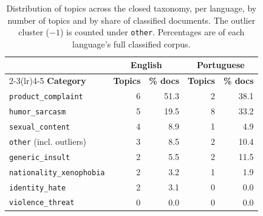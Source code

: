 \begin{table}[htb]
    \centering
    \caption{Distribution of topics across the closed taxonomy, per language, by number of topics and by share of classified documents. The outlier cluster ($-1$) is counted under \texttt{other}. Percentages are of each language's full classified corpus.}
    \label{tab:semantic-categories}
    \small
    \begin{tabular}{lrrrr}
        \toprule
         & \multicolumn{2}{c}{\textbf{English}} & \multicolumn{2}{c}{\textbf{Portuguese}} \\
        \cmidrule(lr){2-3}\cmidrule(lr){4-5}
        \textbf{Category} & \textbf{Topics} & \textbf{\% docs} & \textbf{Topics} & \textbf{\% docs} \\
        \midrule
        \texttt{product\_complaint}      & 6 & 51.3 & 2 & 38.1 \\
        \texttt{humor\_sarcasm}          & 5 & 19.5 & 8 & 33.2 \\
        \texttt{sexual\_content}         & 4 &  8.9 & 1 &  4.9 \\
        \texttt{other} (incl. outliers)  & 3 &  8.5 & 2 & 10.4 \\
        \texttt{generic\_insult}         & 2 &  5.5 & 2 & 11.5 \\
        \texttt{nationality\_xenophobia} & 2 &  3.2 & 1 &  1.9 \\
        \texttt{identity\_hate}          & 2 &  3.1 & 0 &  0.0 \\
        \texttt{violence\_threat}        & 0 &  0.0 & 0 &  0.0 \\
        \bottomrule
    \end{tabular}
\end{table}

